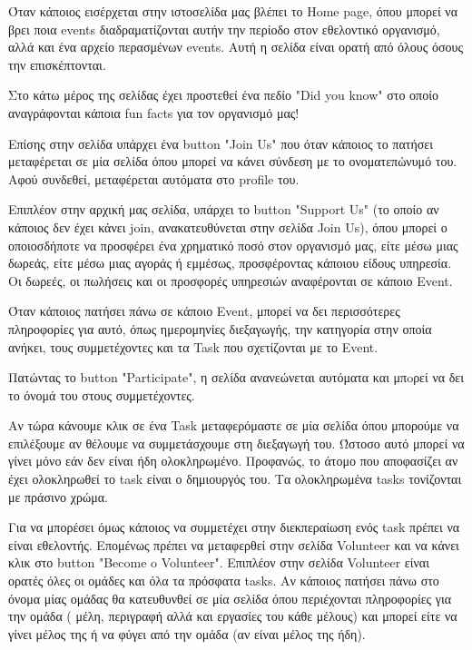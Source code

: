 \documentclass[manuscript,screen,review]{acmart}
\newcommand{\en}[1]{\foreignlanguage{english}{#1}}
\begin{document}
Όταν κάποιος εισέρχεται στην ιστοσελίδα μας βλέπει το \en{Home page}, όπου
μπορεί να βρει ποια \en{events} διαδραματίζονται αυτήν την περίοδο στον
εθελοντικό οργανισμό, αλλά και ένα αρχείο περασμένων \en{events}. Αυτή η σελίδα
είναι ορατή από όλους όσους την επισκέπτονται. 

Στο κάτω μέρος της σελίδας έχει προστεθεί ένα πεδίο \en{"Did you know"} στο
οποίο αναγράφονται κάποια \en{fun facts } για τον οργανισμό μας! 

Επίσης στην σελίδα υπάρχει ένα \en{button "Join Us"} που όταν κάποιος το
πατήσει μεταφέρεται σε μία σελίδα όπου μπορεί να κάνει σύνδεση με το
ονοματεπώνυμό του. Αφού συνδεθεί, μεταφέρεται αυτόματα στο \en{profile} του.

Επιπλέον στην αρχική μας σελίδα, υπάρχει το \en{button "Support Us"} (το οποίο
αν κάποιος δεν έχει κάνει \en{join}, ανακατευθύνεται στην σελίδα \en{Join Us}),
όπου μπορεί ο οποιοσδήποτε να προσφέρει ένα χρηματικό ποσό στον οργανισμό μας,
είτε μέσω μιας δωρεάς, είτε μέσω μιας αγοράς ή εμμέσως, προσφέροντας κάποιου
είδους υπηρεσία. Οι δωρεές, οι πωλήσεις και οι προσφορές υπηρεσιών αναφέρονται
σε κάποιο \en{Event}.

Όταν κάποιος πατήσει πάνω σε κάποιο \en{Event}, μπορεί να δει περισσότερες
πληροφορίες για αυτό, όπως ημερομηνίες διεξαγωγής, την κατηγορία στην οποία
ανήκει, τους συμμετέχοντες και τα \en{Task} που σχετίζονται με το \en{Event}. 

Πατώντας το \en{button "Participate"}, η σελίδα ανανεώνεται αυτόματα και μπoρεί
να δει το όνομά του στους συμμετέχοντες.

Αν τώρα κάνουμε κλικ σε ένα \en{Task} μεταφερόμαστε σε μία σελίδα όπου μπορούμε
να επιλέξουμε αν θέλουμε να συμμετάσχουμε στη διεξαγωγή του. Ώστοσο αυτό μπορεί
να γίνει μόνο εάν δεν είναι ήδη ολοκληρωμένο. Προφανώς, το άτομο που αποφασίζει
αν έχει ολοκληρωθεί το \en{task} είναι ο δημιουργός του. Τα ολοκληρωμένα
\en{tasks} τονίζονται με πράσινο χρώμα.

Για να μπορέσει όμως κάποιος να συμμετέχει στην διεκπεραίωση ενός \en{task}
πρέπει να είναι εθελοντής. Επομένως πρέπει να μεταφερθεί στην σελίδα
\en{Volunteer} και να κάνει κλικ στο \en{button "Become o Volunteer"}. Επιπλέον
στην σελίδα \en{Volunteer} είναι ορατές όλες οι ομάδες και όλα τα πρόσφατα
\en{tasks}. Αν κάποιος πατήσει πάνω στο όνομα μίας ομάδας θα κατευθυνθεί σε μία
σελίδα όπου περιέχονται πληροφορίες για την ομάδα ( μέλη, περιγραφή αλλά και
εργασίες του κάθε μέλους) και μπορεί είτε να γίνει μέλος της ή να φύγει από την
ομάδα (αν είναι μέλος της ήδη).
\end{document}
